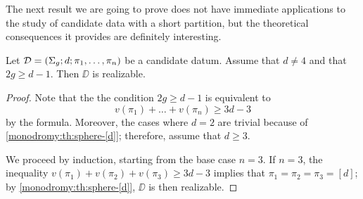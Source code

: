 The next result we are going to prove does not have immediate applications to the study of candidate data with a short partition, but the theoretical consequences it provides are definitely interesting.

\begin{proposition}\label{monodromy:th:sphere-large-g}
Let $\mathcal{D}=(\Sigma_{g};d;\pi_1,\ldots,\pi_n)$ be a candidate datum. Assume that $d\neq 4$ and that $2g\ge d-1$. Then $\DD$ is realizable.
\end{proposition}
\begin{proof}
Note that the the condition $2g\ge d-1$ is equivalent to
\[
v(\pi_1)+\ldots+v(\pi_n)\ge 3d-3
\]
by the \RH{} formula. Moreover, the cases where $d=2$ are trivial because of \cref{monodromy:th:sphere-[d]}; therefore, assume that $d\ge 3$.

We proceed by induction, starting from the base case $n=3$. If $n=3$, the inequality $v(\pi_1)+v(\pi_2)+v(\pi_3)\ge 3d-3$ implies that $\pi_1=\pi_2=\pi_3=[d]$; by \cref{monodromy:th:sphere-[d]}, $\DD$ is then realizable.


\end{proof}
